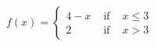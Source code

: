 {${\displaystyle f(x) = \left\{ \begin{array}{rcl} 4-x & \mbox{ if } &  x \leq 3 \\
                                                            2 & \mbox{ if } & x > 3 
                                     \end{array} \right. }$}
{
\begin{center}
\end{center}
}
